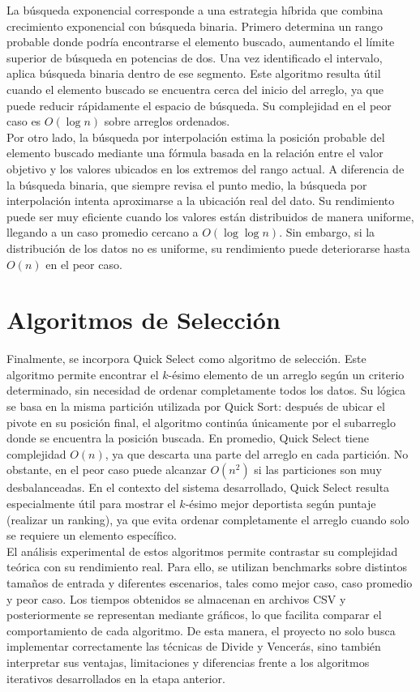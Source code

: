 La búsqueda exponencial corresponde a una estrategia híbrida que combina crecimiento exponencial con búsqueda binaria. Primero determina un rango probable donde podría encontrarse el elemento buscado, aumentando el límite superior de búsqueda en potencias de dos. Una vez identificado el intervalo, aplica búsqueda binaria dentro de ese segmento. Este algoritmo resulta útil cuando el elemento buscado se encuentra cerca del inicio del arreglo, ya que puede reducir rápidamente el espacio de búsqueda. Su complejidad en el peor caso es $O(\log n)$ sobre arreglos ordenados. \\

Por otro lado, la búsqueda por interpolación estima la posición probable del elemento buscado mediante una fórmula basada en la relación entre el valor objetivo y los valores ubicados en los extremos del rango actual. A diferencia de la búsqueda binaria, que siempre revisa el punto medio, la búsqueda por interpolación intenta aproximarse a la ubicación real del dato. Su rendimiento puede ser muy eficiente cuando los valores están distribuidos de manera uniforme, llegando a un caso promedio cercano a $O(\log \log n)$. Sin embargo, si la distribución de los datos no es uniforme, su rendimiento puede deteriorarse hasta $O(n)$ en el peor caso. \\

\section{Algoritmos de Selección}

Finalmente, se incorpora Quick Select como algoritmo de selección. Este algoritmo permite encontrar el $k$-ésimo elemento de un arreglo según un criterio determinado, sin necesidad de ordenar completamente todos los datos. Su lógica se basa en la misma partición utilizada por Quick Sort: después de ubicar el pivote en su posición final, el algoritmo continúa únicamente por el subarreglo donde se encuentra la posición buscada. En promedio, Quick Select tiene complejidad $O(n)$, ya que descarta una parte del arreglo en cada partición. No obstante, en el peor caso puede alcanzar $O(n^2)$ si las particiones son muy desbalanceadas. En el contexto del sistema desarrollado, Quick Select resulta especialmente útil para mostrar el $k$-ésimo mejor deportista según puntaje (realizar un ranking), ya que evita ordenar completamente el arreglo cuando solo se requiere un elemento específico. \\

El análisis experimental de estos algoritmos permite contrastar su complejidad teórica con su rendimiento real. Para ello, se utilizan benchmarks sobre distintos tamaños de entrada y diferentes escenarios, tales como mejor caso, caso promedio y peor caso. Los tiempos obtenidos se almacenan en archivos CSV y posteriormente se representan mediante gráficos, lo que facilita comparar el comportamiento de cada algoritmo. De esta manera, el proyecto no solo busca implementar correctamente las técnicas de Divide y Vencerás, sino también interpretar sus ventajas, limitaciones y diferencias frente a los algoritmos iterativos desarrollados en la etapa anterior. \\
